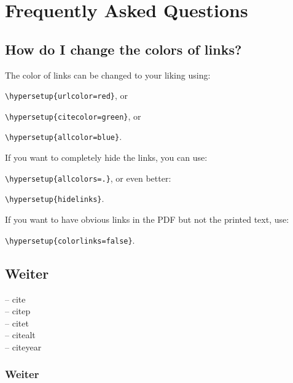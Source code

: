 
\chapter{Frequently Asked Questions} %

\label{AppendixA} %

\section{How do I change the colors of links?}

The color of links can be changed to your liking using:

{\small\verb!\hypersetup{urlcolor=red}!}, or

{\small\verb!\hypersetup{citecolor=green}!}, or

{\small\verb!\hypersetup{allcolor=blue}!}.

\noindent If you want to completely hide the links, you can use:

{\small\verb!\hypersetup{allcolors=.}!}, or even better: 

{\small\verb!\hypersetup{hidelinks}!}.

\noindent If you want to have obvious links in the PDF but not the printed text, use:

{\small\verb!\hypersetup{colorlinks=false}!}.


\section{Weiter}
\cite{messerer_einsatz_2013} -- cite\\ 
\citep{messerer_einsatz_2013} -- citep\\
\citet{messerer_einsatz_2013} -- citet\\
\citealt{messerer_einsatz_2013} -- citealt\\
\citeyear{messerer_einsatz_2013} -- citeyear
\subsection{Weiter}

